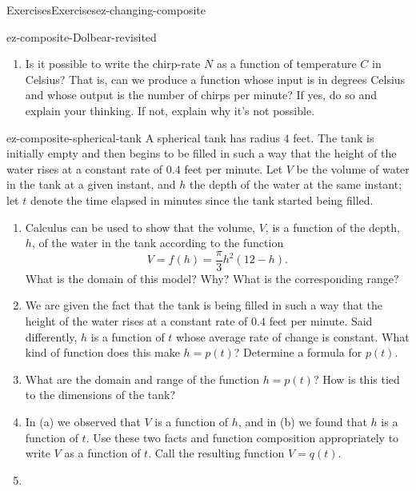 \begin{exercises-subsection}{Exercises}{}{Exercises}{}{}{ez-changing-composite}
\begin{divisionexercise}{2}{}{}{ez-composite-Dolbear-revisited}
\begin{enumerate}[label=\alph*.]
\item\hypertarget{li-237}{}\hypertarget{p-528}{}%
Is it possible to write the chirp-rate $N$ as a function of temperature $C$ in Celsius? That is, can we produce a function whose input is in degrees Celsius and whose output is the number of chirps per minute? If yes, do so and explain your thinking.  If not, explain why it's not possible.%
\end{enumerate}
%
\end{divisionexercise}%
\begin{divisionexercise}{3}{}{}{ez-composite-spherical-tank}%
\hypertarget{p-531}{}%
A spherical tank has radius $4$ feet.  The tank is initially empty and then begins to be filled in such a way that the height of the water rises at a constant rate of $0.4$ feet per minute.  Let $V$ be the volume of water in the tank at a given instant, and $h$ the depth of the water at the same instant; let $t$ denote the time elapsed in minutes since the tank started being filled.%
\par
\hypertarget{p-532}{}%
\leavevmode%
\begin{enumerate}[label=\alph*.]
\item\hypertarget{li-238}{}\hypertarget{p-533}{}%
Calculus can be used to show that the volume, $V$, is a function of the depth, $h$, of the water in the tank according to the function%
\begin{equation}
V = f(h) = \frac{\pi}{3} h^2(12-h)\text{.}\label{E-ez-composite-spherical-tank-V-h}
\end{equation}
What is the domain of this model?  Why?  What is the corresponding range?%
\item\hypertarget{li-239}{}\hypertarget{p-534}{}%
We are given the fact that the tank is being filled in such a way that the height of the water rises at a constant rate of $0.4$ feet per minute.  Said differently, $h$ is a function of $t$ whose average rate of change is constant.  What kind of function does this make $h = p(t)$?  Determine a formula for $p(t)$.%
\item\hypertarget{li-240}{}\hypertarget{p-535}{}%
What are the domain and range of the function $h = p(t)$?  How is this tied to the dimensions of the tank?%
\item\hypertarget{li-241}{}\hypertarget{p-536}{}%
In (a) we observed that $V$ is a function of $h$, and in (b) we found that $h$ is a function of $t$.  Use these two facts and function composition appropriately to write $V$ as a function of $t$.  Call the resulting function $V = q(t)$.%
\item\hypertarget{li-242}{}\hypertarget{p-537}{}%

\end{enumerate}
\end{divisionexercise}
\end{exercises-subsection}

